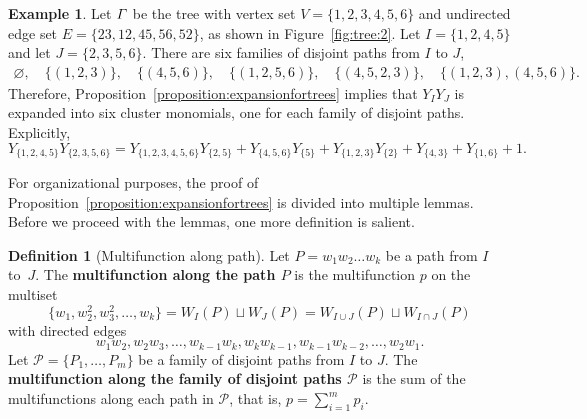 \documentclass[11pt]{article}
\theoremstyle{definition}
\newtheorem{defi}[theo]{Definition}
\newtheorem{exam}[theo]{Example}
\numberwithin{equation}{section}
\newcommand{\vocab}[1]{\textbf{#1}}
\newcommand{\vertices}{V}
\newcommand{\edges}{E}
\begin{document}
\begin{exam}
    Let \(\varGamma\) be the tree with vertex set \(\vertices = \{1,\allowbreak 2,\allowbreak 3,\allowbreak 4,\allowbreak 5,\allowbreak 6\}\) and undirected edge set \(\edges = \{23,\allowbreak 12,\allowbreak 45,\allowbreak 56,\allowbreak 52\}\), as shown in Figure~\ref{fig:tree:2}.
    Let \(I = \{1, 2, 4, 5\}\) and let \(J = \{2, 3, 5, 6\}\).
    There are six families of disjoint paths from \(I\) to \(J\), 
    \begin{gather*}
        \varnothing, \quad
        \big\{ (1, 2, 3) \big\}, \quad
        \big\{ (4, 5, 6) \big\}, \quad
        \big\{ (1, 2, 5, 6) \big\}, \quad
        \big\{ (4, 5, 2, 3) \big\}, \quad
        \big\{ (1, 2, 3), (4, 5, 6) \big\}.
    \end{gather*}
    Therefore, Proposition~\ref{proposition:expansionfortrees} implies that \(Y_IY_J\) is expanded into six cluster monomials, one for each family of disjoint paths. Explicitly,
    \begin{equation*}
        Y_{\{1, 2, 4, 5\}} Y_{\{2, 3, 5, 6\}}
        = Y_{\{1, 2, 3, 4, 5, 6\}} Y_{\{2, 5\}}
        + Y_{\{4, 5, 6\}} Y_{\{5\}}
        + Y_{\{1, 2, 3\}} Y_{\{2\}}
        + Y_{\{4, 3\}}
        + Y_{\{1, 6\}}
        + 1.
    \end{equation*}
\end{exam}

For organizational purposes, the proof of Proposition~\ref{proposition:expansionfortrees} is divided into multiple lemmas.
Before we proceed with the lemmas,
one more definition is salient.

\begin{defi}[Multifunction along path]
    Let \(P = w_1w_2\dots w_k\) be a path from \(I\) to~\(J\).
    The \vocab{multifunction along the path \(P\)} is the multifunction \(p\) on the multiset
    \begin{equation*}
        \{w_1, w_2^2, w_3^2, \dots, w_k\} = W_I(P) \sqcup W_J(P) = W_{I \cup J}(P) \sqcup W_{I \cap J}(P)
    \end{equation*}
    with directed edges
    \begin{equation*}
        w_1w_2, w_2w_3, \dots, w_{k-1}w_k,
        w_kw_{k-1}, w_{k-1}w_{k-2}, \dots, w_2w_1.
    \end{equation*}
    Let \(\mathcal{P} = \{P_1, \dots, P_m\}\) be a family of disjoint paths from \(I\) to \(J\).
    The \vocab{multifunction along the family of disjoint paths \(\mathcal{P}\)} is the sum of the multifunctions along each path in \(\mathcal{P}\),
    that is, \(p = \sum_{i=1}^m p_i\).
\end{defi}
\end{document}
